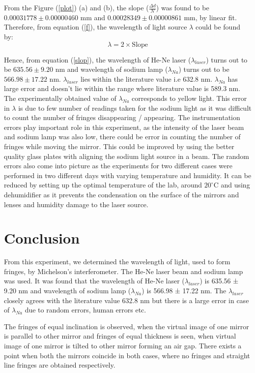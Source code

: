 \documentclass[a4paper, amsfonts, amssymb, amsmath, reprint, showkeys, nofootinbib, twoside]{revtex4-1}
\begin{document}
From the Figure (\ref{plot}) (a) and (b), the slope ($\frac{\Delta d}{N}$) was found to be $0.00031778\pm0.00000460$ mm  and $0.00028349\pm0.00000861$ mm, by linear fit. Therefore, from equation (\ref{f}), the wavelength of light source $\lambda$ could be found by:
\begin{equation} \label{slop}
\lambda=2\times \text{Slope}
\end{equation}

Hence, from equation (\ref{slop}), the wavelength of He-Ne laser ($\lambda_{laser}$) turns out to be $635.56\pm9.20$ nm and wavelength of sodium lamp ($\lambda_{Na}$) turns out to be $566.98\pm17.22$ nm. $\lambda_{laser}$ lies within the literature value i.e 632.8 nm. $\lambda_{Na}$ has large error and doesn't lie within the range where literature value is 589.3 nm. The experimentally obtained value of $\lambda_{Na}$ corresponds to yellow light. This error in $\lambda$ is due to few number of readings taken for the sodium light as it was difficult to count the number of fringes disappearing / appearing. The instrumentation errors play important role in this experiment, as the intensity of the laser beam and sodium lamp was also low, there could be error in counting the number of fringes while moving the mirror. This could be improved by using the better quality glass plates with aligning the sodium light source in a beam. The random errors also come into picture as the experiments for two different cases were performed in two different days with varying temperature and humidity. It can be reduced by setting up the optimal temperature of the lab, around $20^{\circ}$C and using dehumidifier as it prevents the condensation on the surface of the mirrors and lenses and humidity damage to the laser source. 

\section{Conclusion}
From this experiment, we determined the wavelength of light, used to form fringes, by Michelson's interferometer. The He-Ne laser beam and sodium lamp was used. It was found that the wavelength of He-Ne laser ($\lambda_{laser}$) is 635.56 ± 9.20 nm and wavelength of sodium lamp ($\lambda_{Na}$) is 566.98 ± 17.22 nm. The $\lambda_{laser}$ closely agrees with the literature value 632.8 nm but there is a large error in case of $\lambda_{Na}$ due to random errors, human errors etc. 

The fringes of equal inclination is observed, when the virtual image of one mirror is parallel to other mirror and fringes of equal thickness is seen, when virtual image of one mirror is tilted to other mirror forming an air gap. There exists a point when both the mirrors coincide in both cases, where no fringes and straight line fringes are obtained respectively.
\end{document}
